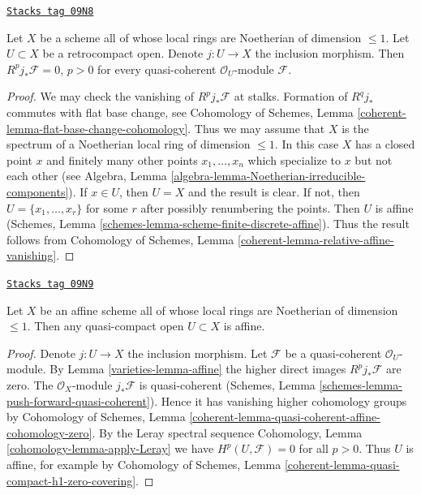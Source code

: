 \begin{lemma}[Affine]
\label{varieties-lemma-affine}
\href{https://stacks.math.columbia.edu/tag/09N8}{\texttt{Stacks tag 09N8}}

Let $X$ be a scheme all of whose local rings are Noetherian of dimension
$\leq 1$. Let $U \subset X$ be a retrocompact open. Denote
$j : U \to X$ the inclusion morphism. Then $R^pj_*\mathcal{F} = 0$, $p > 0$
for every quasi-coherent $\mathcal{O}_U$-module $\mathcal{F}$.
\end{lemma}

\begin{proof}
We may check the vanishing of $R^pj_*\mathcal{F}$ at stalks.
Formation of $R^qj_*$ commutes with flat base change, see
Cohomology of Schemes, Lemma
\ref{coherent-lemma-flat-base-change-cohomology}.
Thus we may assume that $X$ is the spectrum of a Noetherian local
ring of dimension $\leq 1$. In this case $X$ has a closed point
$x$ and finitely many other points $x_1, \ldots, x_n$ which specialize
to $x$ but not each other (see
Algebra, Lemma \ref{algebra-lemma-Noetherian-irreducible-components}).
If $x \in U$, then $U = X$ and the result is clear. If not, then
$U = \{x_1, \ldots, x_r\}$ for some $r$ after possibly renumbering
the points. Then $U$ is affine
(Schemes, Lemma \ref{schemes-lemma-scheme-finite-discrete-affine}).
Thus the result follows from Cohomology of Schemes, Lemma
\ref{coherent-lemma-relative-affine-vanishing}.
\end{proof}

\begin{lemma}
\label{varieties-lemma-open-in-affine-curve-affine}
\href{https://stacks.math.columbia.edu/tag/09N9}{\texttt{Stacks tag 09N9}}

Let $X$ be an affine scheme all of whose local rings are Noetherian
of dimension $\leq 1$. Then any quasi-compact open $U \subset X$ is affine.
\end{lemma}

\begin{proof}

Denote $j : U \to X$ the inclusion morphism. Let $\mathcal{F}$
be a quasi-coherent $\mathcal{O}_U$-module.
By Lemma \ref{varieties-lemma-affine} the higher direct images
$R^pj_*\mathcal{F}$ are zero. The $\mathcal{O}_X$-module $j_*\mathcal{F}$
is quasi-coherent
(Schemes, Lemma \ref{schemes-lemma-push-forward-quasi-coherent}).
Hence it has vanishing higher cohomology groups by
Cohomology of Schemes, Lemma
\ref{coherent-lemma-quasi-coherent-affine-cohomology-zero}.
By the Leray spectral sequence
Cohomology, Lemma \ref{cohomology-lemma-apply-Leray}
we have $H^p(U, \mathcal{F}) = 0$ for all $p > 0$.
Thus $U$ is affine, for example by
Cohomology of Schemes, Lemma
\ref{coherent-lemma-quasi-compact-h1-zero-covering}.
\end{proof}

